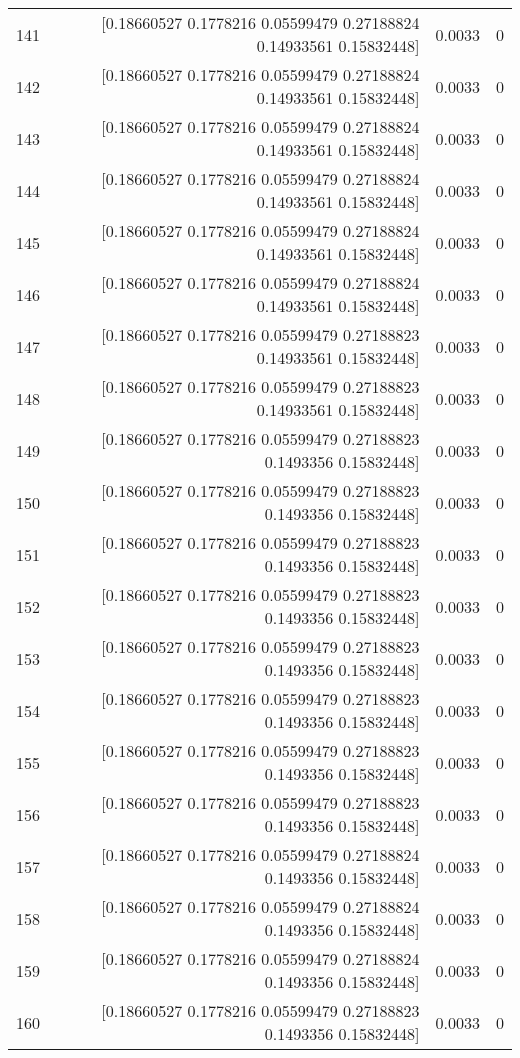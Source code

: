 \begin{longtable}{lrrr}
141 & [0.18660527 0.1778216  0.05599479 0.27188824 0.14933561 0.15832448] & 0.0033 & 0 \\
142 & [0.18660527 0.1778216  0.05599479 0.27188824 0.14933561 0.15832448] & 0.0033 & 0 \\
143 & [0.18660527 0.1778216  0.05599479 0.27188824 0.14933561 0.15832448] & 0.0033 & 0 \\
144 & [0.18660527 0.1778216  0.05599479 0.27188824 0.14933561 0.15832448] & 0.0033 & 0 \\
145 & [0.18660527 0.1778216  0.05599479 0.27188824 0.14933561 0.15832448] & 0.0033 & 0 \\
146 & [0.18660527 0.1778216  0.05599479 0.27188824 0.14933561 0.15832448] & 0.0033 & 0 \\
147 & [0.18660527 0.1778216  0.05599479 0.27188823 0.14933561 0.15832448] & 0.0033 & 0 \\
148 & [0.18660527 0.1778216  0.05599479 0.27188823 0.14933561 0.15832448] & 0.0033 & 0 \\
149 & [0.18660527 0.1778216  0.05599479 0.27188823 0.1493356  0.15832448] & 0.0033 & 0 \\
150 & [0.18660527 0.1778216  0.05599479 0.27188823 0.1493356  0.15832448] & 0.0033 & 0 \\
151 & [0.18660527 0.1778216  0.05599479 0.27188823 0.1493356  0.15832448] & 0.0033 & 0 \\
152 & [0.18660527 0.1778216  0.05599479 0.27188823 0.1493356  0.15832448] & 0.0033 & 0 \\
153 & [0.18660527 0.1778216  0.05599479 0.27188823 0.1493356  0.15832448] & 0.0033 & 0 \\
154 & [0.18660527 0.1778216  0.05599479 0.27188823 0.1493356  0.15832448] & 0.0033 & 0 \\
155 & [0.18660527 0.1778216  0.05599479 0.27188823 0.1493356  0.15832448] & 0.0033 & 0 \\
156 & [0.18660527 0.1778216  0.05599479 0.27188823 0.1493356  0.15832448] & 0.0033 & 0 \\
157 & [0.18660527 0.1778216  0.05599479 0.27188824 0.1493356  0.15832448] & 0.0033 & 0 \\
158 & [0.18660527 0.1778216  0.05599479 0.27188824 0.1493356  0.15832448] & 0.0033 & 0 \\
159 & [0.18660527 0.1778216  0.05599479 0.27188824 0.1493356  0.15832448] & 0.0033 & 0 \\
160 & [0.18660527 0.1778216  0.05599479 0.27188823 0.1493356  0.15832448] & 0.0033 & 0 \\

\end{longtable}
